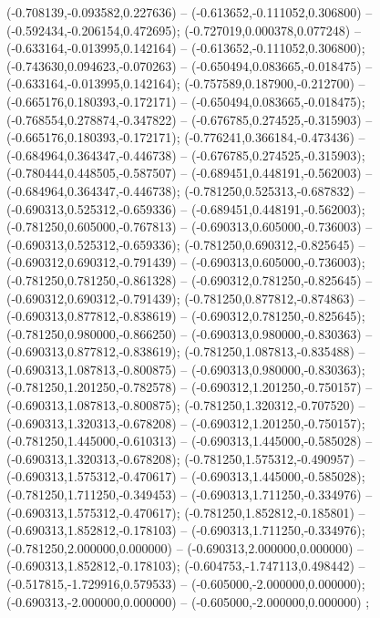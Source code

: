  (-0.708139,-0.093582,0.227636) -- (-0.613652,-0.111052,0.306800) -- (-0.592434,-0.206154,0.472695);
 (-0.727019,0.000378,0.077248) -- (-0.633164,-0.013995,0.142164) -- (-0.613652,-0.111052,0.306800);
 (-0.743630,0.094623,-0.070263) -- (-0.650494,0.083665,-0.018475) -- (-0.633164,-0.013995,0.142164);
 (-0.757589,0.187900,-0.212700) -- (-0.665176,0.180393,-0.172171) -- (-0.650494,0.083665,-0.018475);
 (-0.768554,0.278874,-0.347822) -- (-0.676785,0.274525,-0.315903) -- (-0.665176,0.180393,-0.172171);
 (-0.776241,0.366184,-0.473436) -- (-0.684964,0.364347,-0.446738) -- (-0.676785,0.274525,-0.315903);
 (-0.780444,0.448505,-0.587507) -- (-0.689451,0.448191,-0.562003) -- (-0.684964,0.364347,-0.446738);
 (-0.781250,0.525313,-0.687832) -- (-0.690313,0.525312,-0.659336) -- (-0.689451,0.448191,-0.562003);
 (-0.781250,0.605000,-0.767813) -- (-0.690313,0.605000,-0.736003) -- (-0.690313,0.525312,-0.659336);
 (-0.781250,0.690312,-0.825645) -- (-0.690312,0.690312,-0.791439) -- (-0.690313,0.605000,-0.736003);
 (-0.781250,0.781250,-0.861328) -- (-0.690312,0.781250,-0.825645) -- (-0.690312,0.690312,-0.791439);
 (-0.781250,0.877812,-0.874863) -- (-0.690313,0.877812,-0.838619) -- (-0.690312,0.781250,-0.825645);
 (-0.781250,0.980000,-0.866250) -- (-0.690313,0.980000,-0.830363) -- (-0.690313,0.877812,-0.838619);
 (-0.781250,1.087813,-0.835488) -- (-0.690313,1.087813,-0.800875) -- (-0.690313,0.980000,-0.830363);
 (-0.781250,1.201250,-0.782578) -- (-0.690312,1.201250,-0.750157) -- (-0.690313,1.087813,-0.800875);
 (-0.781250,1.320312,-0.707520) -- (-0.690313,1.320313,-0.678208) -- (-0.690312,1.201250,-0.750157);
 (-0.781250,1.445000,-0.610313) -- (-0.690313,1.445000,-0.585028) -- (-0.690313,1.320313,-0.678208);
 (-0.781250,1.575312,-0.490957) -- (-0.690313,1.575312,-0.470617) -- (-0.690313,1.445000,-0.585028);
 (-0.781250,1.711250,-0.349453) -- (-0.690313,1.711250,-0.334976) -- (-0.690313,1.575312,-0.470617);
 (-0.781250,1.852812,-0.185801) -- (-0.690313,1.852812,-0.178103) -- (-0.690313,1.711250,-0.334976);
 (-0.781250,2.000000,0.000000) -- (-0.690313,2.000000,0.000000) -- (-0.690313,1.852812,-0.178103);
 (-0.604753,-1.747113,0.498442) -- (-0.517815,-1.729916,0.579533) -- (-0.605000,-2.000000,0.000000);
 (-0.690313,-2.000000,0.000000) -- (-0.605000,-2.000000,0.000000) ;
